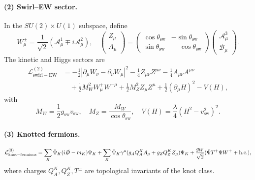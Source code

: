 \documentclass[11pt]{article}
\begin{document}
        \paragraph{(2) Swirl–EW sector.}
        In the $SU(2)\times U(1)$ subspace, define
        \begin{equation}
            W^\pm_\mu = \frac{1}{\sqrt{2}}(\mathcal{A}^1_\mu \mp i\mathcal{A}^2_\mu),
            \quad
            \begin{pmatrix} Z_\mu \\ A_\mu \end{pmatrix}
            = \begin{pmatrix} \cos\theta_{\mathrm{sw}} & -\sin\theta_{\mathrm{sw}}\\
            \sin\theta_{\mathrm{sw}} & \phantom{-}\cos\theta_{\mathrm{sw}} \end{pmatrix}
            \begin{pmatrix} \mathcal{A}^3_\mu \\ \mathcal{B}_\mu \end{pmatrix}.
        \end{equation}
        The kinetic and Higgs sectors are
        \begin{align}
            \mathcal{L}^{(2)}_{\mathrm{swirl-EW}} &=
            -\frac{1}{2} | \partial_\mu W_\nu - \partial_\nu W_\mu |^2
            -\frac14 Z_{\mu\nu} Z^{\mu\nu} - \frac14 A_{\mu\nu}A^{\mu\nu} \nonumber\\
            &\quad + \frac12 M_W^2 W_\mu^+ W^{-\mu} + \frac12 M_Z^2 Z_\mu Z^\mu
            + \frac12 (\partial_\mu H)^2 - V(H),
        \end{align}
        with
        \begin{equation}
            M_W = \frac12 g_{\mathrm{sw}} v_{\mathrm{sw}}, \quad
            M_Z = \frac{M_W}{\cos\theta_{\mathrm{sw}}}, \quad
            V(H) = \frac{\lambda}{4}(H^2 - v_{\mathrm{sw}}^2)^2 .
        \end{equation}

        \paragraph{(3) Knotted fermions.}
        \begin{equation}
            \mathcal{L}^{(3)}_{\mathrm{knot-fermions}}
            = \sum_K \bar{\Psi}_K (i\slashed{D} - m_K)\Psi_K
            + \sum_K \bar{\Psi}_K\gamma^\mu (g_A Q_A^K A_\mu + g_Z Q_Z^K Z_\mu)\Psi_K
            + \frac{g_W}{\sqrt{2}} (\bar{\Psi} T^+ \Psi W^+ + \mathrm{h.c.}),
        \end{equation}
        where charges $Q_A^K, Q_Z^K, T^\pm$ are topological invariants of the knot class.
\end{document}
